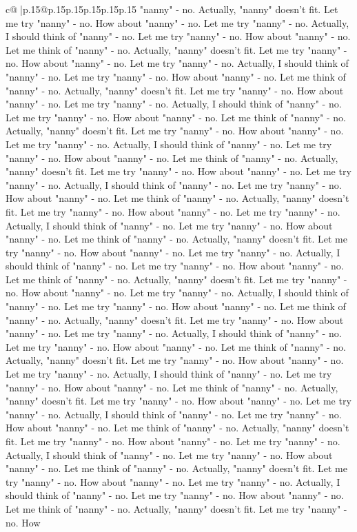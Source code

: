 \documentclass{article}
\begin{document}
{\begin{supertabular}{c@{$\;$}|p{.15\linewidth}@{}p{.15\linewidth}p{.15\linewidth}p{.15\linewidth}p{.15\linewidth}p{.15\linewidth}}
{{{"nanny" {-} no. Actually, "nanny" doesn't fit. Let me try "nanny" {-} no. How about "nanny" {-} no. Let me try "nanny" {-} no. Actually, I should think of "nanny" {-} no. Let me try "nanny" {-} no. How about "nanny" {-} no. Let me think of "nanny" {-} no. Actually, "nanny" doesn't fit. Let me try "nanny" {-} no. How about "nanny" {-} no. Let me try "nanny" {-} no. Actually, I should think of "nanny" {-} no. Let me try "nanny" {-} no. How about "nanny" {-} no. Let me think of "nanny" {-} no. Actually, "nanny" doesn't fit. Let me try "nanny" {-} no. How about "nanny" {-} no. Let me try "nanny" {-} no. Actually, I should think of "nanny" {-} no. Let me try "nanny" {-} no. How about "nanny" {-} no. Let me think of "nanny" {-} no. Actually, "nanny" doesn't fit. Let me try "nanny" {-} no. How about "nanny" {-} no. Let me try "nanny" {-} no. Actually, I should think of "nanny" {-} no. Let me try "nanny" {-} no. How about "nanny" {-} no. Let me think of "nanny" {-} no. Actually, "nanny" doesn't fit. Let me try "nanny" {-} no. How about "nanny" {-} no. Let me try "nanny" {-} no. Actually, I should think of "nanny" {-} no. Let me try "nanny" {-} no. How about "nanny" {-} no. Let me think of "nanny" {-} no. Actually, "nanny" doesn't fit. Let me try "nanny" {-} no. How about "nanny" {-} no. Let me try "nanny" {-} no. Actually, I should think of "nanny" {-} no. Let me try "nanny" {-} no. How about "nanny" {-} no. Let me think of "nanny" {-} no. Actually, "nanny" doesn't fit. Let me try "nanny" {-} no. How about "nanny" {-} no. Let me try "nanny" {-} no. Actually, I should think of "nanny" {-} no. Let me try "nanny" {-} no. How about "nanny" {-} no. Let me think of "nanny" {-} no. Actually, "nanny" doesn't fit. Let me try "nanny" {-} no. How about "nanny" {-} no. Let me try "nanny" {-} no. Actually, I should think of "nanny" {-} no. Let me try "nanny" {-} no. How about "nanny" {-} no. Let me think of "nanny" {-} no. Actually, "nanny" doesn't fit. Let me try "nanny" {-} no. How about "nanny" {-} no. Let me try "nanny" {-} no. Actually, I should think of "nanny" {-} no. Let me try "nanny" {-} no. How about "nanny" {-} no. Let me think of "nanny" {-} no. Actually, "nanny" doesn't fit. Let me try "nanny" {-} no. How about "nanny" {-} no. Let me try "nanny" {-} no. Actually, I should think of "nanny" {-} no. Let me try "nanny" {-} no. How about "nanny" {-} no. Let me think of "nanny" {-} no. Actually, "nanny" doesn't fit. Let me try "nanny" {-} no. How about "nanny" {-} no. Let me try "nanny" {-} no. Actually, I should think of "nanny" {-} no. Let me try "nanny" {-} no. How about "nanny" {-} no. Let me think of "nanny" {-} no. Actually, "nanny" doesn't fit. Let me try "nanny" {-} no. How about "nanny" {-} no. Let me try "nanny" {-} no. Actually, I should think of "nanny" {-} no. Let me try "nanny" {-} no. How about "nanny" {-} no. Let me think of "nanny" {-} no. Actually, "nanny" doesn't fit. Let me try "nanny" {-} no. How about "nanny" {-} no. Let me try "nanny" {-} no. Actually, I should think of "nanny" {-} no. Let me try "nanny" {-} no. How about "nanny" {-} no. Let me think of "nanny" {-} no. Actually, "nanny" doesn't fit. Let me try "nanny" {-} no. How }}}
\end{supertabular}}
\end{document}
